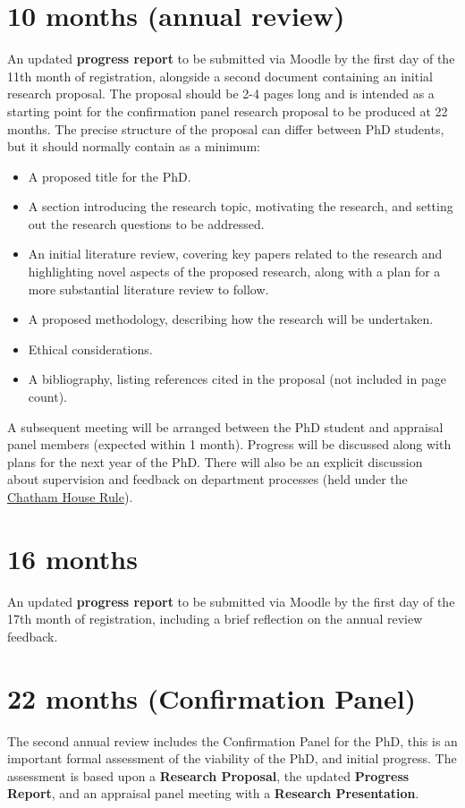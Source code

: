 \documentclass[12pt,a4paper]{article}
\begin{document}
\section{10 months (annual review)}
An updated \textbf{progress report} to be submitted via Moodle by the first day of the 11th month of registration, alongside a second document containing an initial research proposal. The proposal should be 2-4 pages long and is intended as a starting point for the confirmation panel research proposal to be produced at 22 months. The precise structure of the proposal can differ between PhD students, but it should normally contain as a minimum:
\begin{itemize}
	\item A proposed title for the PhD.
	\item A section introducing the research topic, motivating the research, and setting out the research questions to be addressed.
	\item An initial literature review, covering key papers related to the research and highlighting novel aspects of the proposed research, along with a plan for a more substantial literature review to follow.
	\item A proposed methodology, describing how the research will be undertaken.
	\item Ethical considerations.
	\item A bibliography, listing references cited in the proposal (not included in page count).
\end{itemize}

A subsequent meeting will be arranged between the PhD student and appraisal panel members (expected within 1 month). Progress will be discussed along with plans for the next year of the PhD. There will also be an explicit discussion about supervision and feedback on department processes (held under the \href{https://www.chathamhouse.org/chatham-house-rule}{Chatham House Rule}).

\section{16 months}
An updated \textbf{progress report} to be submitted via Moodle by the first day of the 17th month of registration, including a brief reflection on the annual review feedback.

\section{22 months (Confirmation Panel)}
The second annual review includes the Confirmation Panel for the PhD, this is an important formal assessment of the viability of the PhD, and initial progress. The assessment is based upon a \textbf{Research Proposal}, the updated \textbf{Progress Report}, and an appraisal panel meeting with a \textbf{Research Presentation}.
\end{document}
